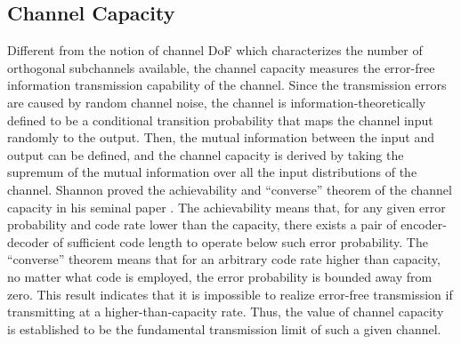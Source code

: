 \documentclass[journal,twocolumn]{IEEEtran}
\begin{document}


\subsection{Channel Capacity}
\label{Sec_2_Subsec_2}
Different from the notion of channel DoF which characterizes the number of orthogonal subchannels available, the channel capacity measures the error-free information transmission capability of the channel. 
Since the transmission errors are caused by random channel noise, the channel is information-theoretically defined to be a conditional transition probability that maps the channel input randomly to the output. 
Then, the mutual information between the input and output can be defined, and the channel capacity is derived by taking the supremum of the mutual information over all the input distributions of the channel. Shannon proved the achievability and ``converse'' theorem of the channel capacity in his seminal paper \cite{shannon1948mathematical}. The achievability means that, for any given error probability and code rate lower than the capacity, there exists a pair of encoder-decoder of sufficient code length to operate below such error probability. 
The ``converse'' theorem means that for an arbitrary code rate higher than capacity, no matter what code is employed, the error probability is bounded away from zero. This result indicates that it is impossible to realize error-free transmission if transmitting at a higher-than-capacity rate. Thus, the value of channel capacity is established to be the fundamental transmission limit of such a given channel. 
\end{document}
